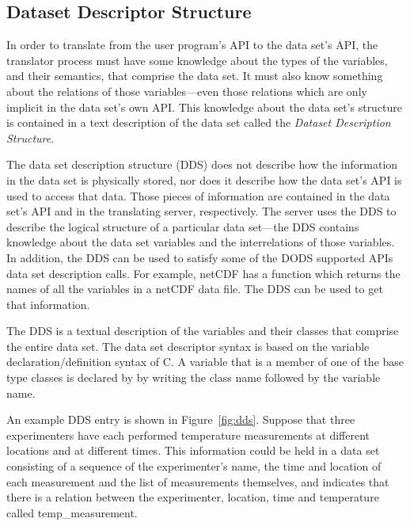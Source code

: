 \subsection{Dataset Descriptor Structure}
\label{api:dds}

In order to translate from the user program's API to the data set's API, the
translator process must have some knowledge about the types of the variables,
and their semantics, that comprise the data set. It must also know something
about the relations of those variables---even those relations which are only
implicit in the data set's own API\@. This knowledge about the data set's
structure is contained in a text description of the data set called the {\em
  Dataset Description Structure}.

The data set description structure (DDS) does not describe how the
information in the data set is physically stored, nor does it describe how
the data set's API is used to access that data. Those pieces of information
are contained in the data set's API and in the translating server,
respectively.  The server uses the DDS to describe the logical structure of a
particular data set---the DDS contains knowledge about the data set variables
and the interrelations of those variables.  In addition, the DDS can be used
to satisfy some of the DODS supported APIs data set description calls. For
example, netCDF has a function which returns the names of all the variables
in a netCDF data file. The DDS can be used to get that information.

The DDS is a textual description of the variables and their classes that
comprise the entire data set. The data set descriptor syntax is based on the
variable declaration/definition syntax of C\cite{ritchie:c}. A variable that
is a member of one of the base type classes is declared by by writing the
class name followed by the variable name.

An example DDS entry is shown in Figure~\ref{fig:dds}. Suppose that three
experimenters have each performed temperature measurements at different
locations and at different times. This information could be held in a data set
consisting of a sequence of the experimenter's name, the time and location of
each measurement and the list of measurements themselves, and indicates that
there is a relation between the experimenter, location, time and temperature
called temp\_measurement.

